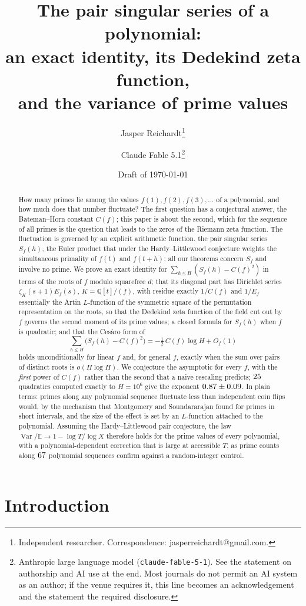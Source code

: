 \documentclass[11pt,a4paper]{article}
\title{The pair singular series of a polynomial:\\ an exact identity, its Dedekind zeta function,\\ and the variance of prime values}
\author{Jasper Reichardt\thanks{Independent researcher. Correspondence: jasperreichardt@gmail.com.}
\and Claude Fable 5.1\thanks{Anthropic large language model (\texttt{claude-fable-5-1}). See the statement on
authorship and AI use at the end. Most journals do not permit an AI system as an author; if the venue
requires it, this line becomes an acknowledgement and the statement the required disclosure.}}
\date{Draft of \today}
\theoremstyle{remark}\newtheorem{remark}[theorem]{Remark}
\newcommand{\Q}{\mathbb{Q}}
\newcommand{\Var}{\operatorname{Var}}
\newcommand{\E}{\mathbb{E}}
\begin{document}
\maketitle

\begin{abstract}
How many primes lie among the values $f(1),f(2),f(3),\dots$ of a polynomial, and how much does that
number fluctuate? The first question has a conjectural answer, the Bateman--Horn constant $C(f)$; this
paper is about the second, which for the sequence of all primes is the question that leads to the zeros
of the Riemann zeta function. The fluctuation is governed by an explicit arithmetic function, the pair
singular series $S_f(h)$, the Euler product that under the Hardy--Littlewood conjecture weights the
simultaneous primality of $f(t)$ and $f(t+h)$; all our theorems concern $S_f$ and involve no prime. We
prove an exact identity for $\sum_{h\le H}(S_f(h)-C(f)^2)$ in terms of the roots of $f$ modulo squarefree
$d$; that its diagonal part has Dirichlet series $\zeta_K(s+1)E_f(s)$, $K=\Q[t]/(f)$, with residue exactly
$1/C(f)$ and $1/E_f$ essentially the Artin $L$-function of the symmetric square of the permutation
representation on the roots, so that the Dedekind zeta function of the field cut out by $f$ governs the
second moment of its prime values; a closed formula for $S_f(h)$ when $f$ is quadratic; and that the
Ces\`aro form of
\[
\sum_{h\le H}\bigl(S_f(h)-C(f)^2\bigr)=-\tfrac12\,C(f)\log H+O_f(1)
\]
holds unconditionally for linear $f$ and, for general $f$, exactly when the sum over pairs of distinct
roots is $o(H\log H)$. We conjecture the asymptotic for every $f$, with the \emph{first} power of $C(f)$
rather than the second that a naive rescaling predicts; $25$ quadratics computed exactly to $H=10^6$
give the exponent $0.87\pm0.09$. In plain terms: primes along any polynomial sequence fluctuate
less than independent coin flips would, by the mechanism that Montgomery and Soundararajan found for
primes in short intervals, and the size of the effect is set by an $L$-function attached to the
polynomial. Assuming the Hardy--Littlewood pair conjecture, the law $\Var/\E\to1-\log T/\log X$ therefore
holds for the prime values of every polynomial, with a polynomial-dependent correction that is large at
accessible $T$, as prime counts along $67$ polynomial sequences confirm against a random-integer
control.
\end{abstract}

\section{Introduction}
\end{document}
